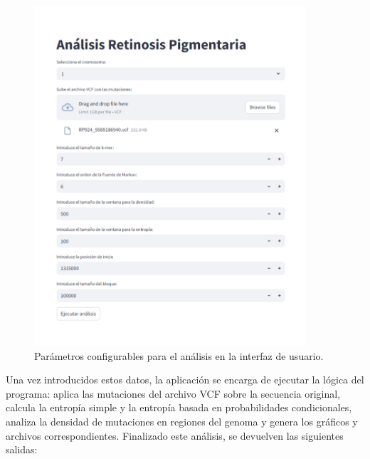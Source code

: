 \documentclass[11pt,spanish,listoffigures,listoftables]{tfgetsinf}
\begin{document}
\begin{figure}[H]
      \centering
      \includegraphics[width=0.9\textwidth]{Analisis_RP.png}
      \caption{Parámetros configurables para el análisis en la interfaz de usuario.}
      \label{fig:etiqueta_opcional8}
   \end{figure}
 

Una vez introducidos estos datos, la aplicación se encarga de ejecutar la lógica del programa: aplica las mutaciones del archivo \ac{VCF} sobre la secuencia original, calcula la entropía simple y la entropía basada en probabilidades condicionales, analiza la densidad de mutaciones en regiones del genoma y genera los gráficos y archivos correspondientes. Finalizado este análisis, se devuelven las siguientes salidas:  
\end{document}
